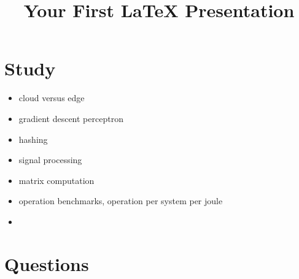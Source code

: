 \documentclass[main.tex]{subfiles}
\begin{document}
\title{Your First \LaTeX{} Presentation}

\section{Study}

\begin{itemize}
\item cloud versus edge
\item gradient descent
\itme perceptron
\item hashing
\item signal processing
\item matrix computation
\item operation benchmarks, operation per system per joule
\item 
\end{itemize}

\section{Questions}
\end{document}
